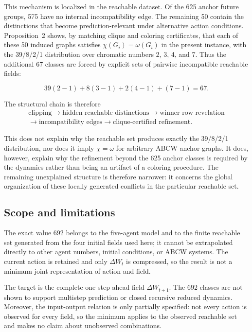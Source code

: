 \documentclass[
  11pt,
]{article}
\begin{document}
This mechanism is localized in the reachable dataset. Of the 625 anchor
future groups, 575 have no internal incompatibility edge. The remaining
50 contain the distinctions that become prediction-relevant under
alternative action conditions. Proposition~2 shows, by matching clique
and coloring certificates, that each of these 50 induced graphs satisfies
\(\chi(G_i)=\omega(G_i)\) in the present instance, with the 39/8/2/1
distribution over chromatic numbers 2, 3, 4, and 7. Thus the additional
67 classes are forced by explicit sets of pairwise incompatible
reachable fields:

\[
39(2-1)+8(3-1)+2(4-1)+(7-1)=67.
\]

The structural chain is therefore
\[
\begin{array}{c}
\text{clipping}\longrightarrow
\text{hidden reachable distinctions}\longrightarrow
\text{winner-row revelation}\\[2pt]
\longrightarrow\text{incompatibility edges}\longrightarrow
\text{clique-certified refinement}.
\end{array}
\]

This does not explain why the reachable set produces exactly the
39/8/2/1 distribution, nor does it imply \(\chi=\omega\) for arbitrary
ABCW anchor graphs. It does, however, explain why the refinement beyond
the 625 anchor classes is required by the dynamics rather than being an
artifact of a coloring procedure. The remaining unexplained structure
is therefore narrower: it concerns the global organization of these
locally generated conflicts in the particular reachable set.

\subsection{Scope and limitations}\label{scope-and-limitations}

The exact value 692 belongs to the five-agent model and to the finite
reachable set generated from the four initial fields used here; it cannot
be extrapolated directly to other agent numbers, initial conditions, or
ABCW systems. The current action is retained and only \({\Delta W_t}\)
is compressed, so the result is not a minimum joint representation of
action and field.

The target is the complete one-step-ahead field \({\Delta W_{t+1}}\).
The 692 classes are not shown to support multistep prediction or closed
recursive reduced dynamics. Moreover, the input-output relation is only
partially specified: not every action is observed for every field, so the
minimum applies to the observed reachable set and makes no claim about
unobserved combinations.
\end{document}
